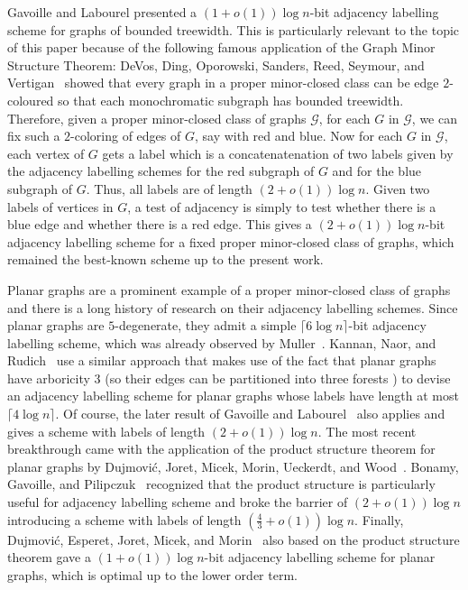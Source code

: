 \documentclass{patmorin}
\newcommand{\calG}{\mathcal{G}}
\begin{document}
Gavoille and Labourel \cite{gavoille.labourel:shorter} presented
a $(1+o(1))\log n$-bit adjacency labelling scheme for graphs of bounded treewidth.
This is particularly relevant to the topic of this paper because of the following famous application of the Graph Minor Structure Theorem:
DeVos, Ding, Oporowski, Sanders, Reed, Seymour, and Vertigan~\cite{devos2004} showed that every graph
in a proper minor-closed class can be edge $2$-coloured so that each monochromatic subgraph
has bounded treewidth.
Therefore, given a proper minor-closed class of graphs $\calG$,
for each $G$ in $\calG$, we can fix such a $2$-coloring of edges of $G$, say with red and blue.
Now for each $G$ in $\calG$, each vertex of $G$ gets a label which is a concatenatenation of two labels given by the adjacency labelling schemes for the red subgraph of $G$ and for the blue subgraph of $G$. Thus, all labels are of length $(2+o(1))\log n$.
Given two labels of vertices in $G$,
a test of adjacency is simply to test whether there is a blue edge and whether there is a red edge.
This gives a $(2+o(1))\log n$-bit adjacency labelling scheme for a fixed proper minor-closed class of graphs, which remained the best-known scheme up to the present work.

Planar graphs are a prominent example of a proper minor-closed class of graphs and there is a long history of research
on their adjacency labelling schemes.
Since planar graphs are $5$-degenerate,
they admit a simple $\lceil6\log n\rceil$-bit adjacency labelling scheme, which was already observed by Muller~\cite{muller:local}.
Kannan, Naor, and Rudich~\cite{kannan.naor.ea:implicit} use a similar approach that makes use of the fact that planar graphs have arboricity 3 (so their edges can be partitioned into three forests \cite{nash-williams:edge-disjoint}) to devise an adjacency labelling scheme for planar graphs whose labels have length at most $\lceil4\log n\rceil$.
Of course, the later result of Gavoille and Labourel~\cite{gavoille.labourel:shorter} also applies and gives a scheme with labels of length $(2+o(1))\log n$.
The most recent breakthrough came with the application of the product structure theorem for planar graphs by Dujmovi\'c, Joret, Micek, Morin, Ueckerdt, and Wood~\cite{dujmovic.joret.ea:planar}.
Bonamy, Gavoille, and Pilipczuk~\cite{BGP22} recognized that the product structure is particularly useful for adjacency labelling scheme and broke the barrier of $(2+o(1))\log n$ introducing a scheme with labels of length $(\frac{4}{3}+o(1))\log n$.
Finally, Dujmovi\'c, Esperet, Joret, Micek, and Morin~\cite{dujmovic.esperet.ea:adjacency} also based on the product structure theorem gave a $(1+o(1))\log n$-bit adjacency labelling scheme for planar graphs, which is optimal up to the lower order term.
\end{document}
